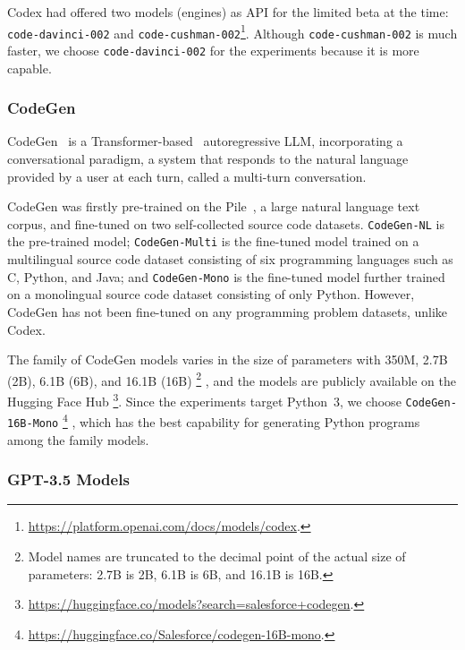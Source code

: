 \documentclass{article}
\begin{document}
Codex had offered two models (engines) as API for the limited beta at the time: \texttt{code-davinci-002} and \texttt{code-cushman-002}\footnote{\url{https://platform.openai.com/docs/models/codex}.}.
Although \texttt{code-cushman-002} is much faster, we choose \texttt{code-davinci-002} for the experiments because it is more capable.





\subsubsection{CodeGen}
\label{sec:experiments:models:codegen}

CodeGen~\citep{nijkamp2022codegen} is a Transformer-based~\citep{vaswani2017transformer} autoregressive LLM, incorporating a conversational paradigm, a system that responds to the natural language provided by a user at each turn, called a multi-turn conversation.

CodeGen was firstly pre-trained on the Pile~\citep{gao2021thepile}, a large natural language text corpus, and fine-tuned on two self-collected source code datasets.
\texttt{CodeGen-NL} is the pre-trained model; \texttt{CodeGen-Multi} is the fine-tuned model trained on a multilingual source code dataset consisting of six programming languages such as C, Python, and Java; and \texttt{CodeGen-Mono} is the fine-tuned model further trained on a monolingual source code dataset consisting of only Python.
However, CodeGen has not been fine-tuned on any programming problem datasets, unlike Codex.

The family of CodeGen models varies in the size of parameters with 350M, 2.7B (2B), 6.1B (6B), and 16.1B (16B)%
\footnote{Model names are truncated to the decimal point of the actual size of parameters: 2.7B is 2B, 6.1B is 6B, and 16.1B is 16B.}%
, and the models are publicly available on the Hugging Face Hub%
\footnote{\url{https://huggingface.co/models?search=salesforce+codegen}.}.
Since the experiments target Python~3, we choose \texttt{CodeGen-16B-Mono}%
\footnote{\url{https://huggingface.co/Salesforce/codegen-16B-mono}.}%
, which has the best capability for generating Python programs among the family models.





\subsubsection{GPT-3.5 Models}
\label{sec:experiments:models:gpt-3.5}
\end{document}
